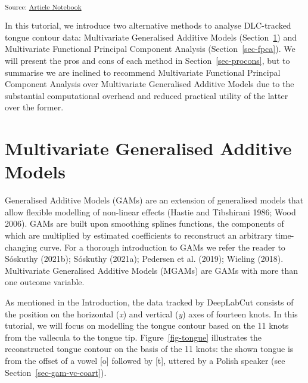 \documentclass[
]{interact}
\begin{document}
\textsubscript{Source:
\href{https://stefanocoretta.github.io/mv_uti/index.qmd.html}{Article
Notebook}}

In this tutorial, we introduce two alternative methods to analyse
DLC-tracked tongue contour data: Multivariate Generalised Additive
Models (Section~\ref{sec-gam}) and Multivariate Functional Principal
Component Analysis (Section~\ref{sec-fpca}). We will present the pros
and cons of each method in Section~\ref{sec-procons}, but to summarise
we are inclined to recommend Multivariate Functional Principal Component
Analysis over Multivariate Generalised Additive Models due to the
substantial computational overhead and reduced practical utility of the
latter over the former.

\section{Multivariate Generalised Additive Models}\label{sec-gam}

Generalised Additive Models (GAMs) are an extension of generalised
models that allow flexible modelling of non-linear effects (Hastie and
Tibshirani 1986; Wood 2006). GAMs are built upon smoothing splines
functions, the components of which are multiplied by estimated
coefficients to reconstruct an arbitrary time-changing curve. For a
thorough introduction to GAMs we refer the reader to Sóskuthy (2021b);
Sóskuthy (2021a); Pedersen et al. (2019); Wieling (2018). Multivariate
Generalised Additive Models (MGAMs) are GAMs with more than one outcome
variable.

As mentioned in the Introduction, the data tracked by DeepLabCut
consists of the position on the horizontal (\emph{x}) and vertical
(\emph{y}) axes of fourteen knots. In this tutorial, we will focus on
modelling the tongue contour based on the 11 knots from the vallecula to
the tongue tip. Figure~\ref{fig-tongue} illustrates the reconstructed
tongue contour on the basis of the 11 knots: the shown tongue is from
the offset of a vowel {[}o{]} followed by {[}t{]}, uttered by a Polish
speaker (see Section~\ref{sec-gam-vc-coart}).
\end{document}
